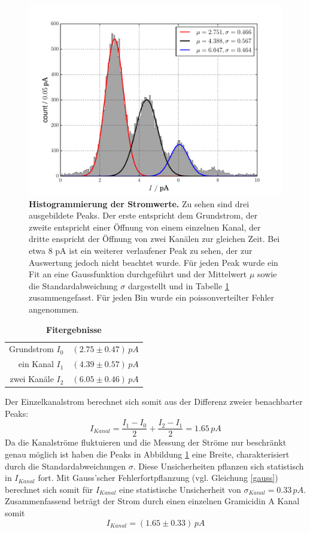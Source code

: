 \documentclass{include/thesisclass3}
\newcommand{\e}[1]{\,\si{#1}}
\begin{document}
\begin{figure}[H]
\centering
\includegraphics[scale=0.7]{images/single_hist.pdf}
\caption{\textbf{Histogrammierung der Stromwerte.} Zu sehen sind drei ausgebildete Peaks. Der erste entspricht dem Grundstrom, der zweite entspricht einer Öffnung von einem einzelnen Kanal, der dritte enspricht der Öffnung von zwei Kanälen zur gleichen Zeit. Bei etwa 8 pA ist ein weiterer verlaufener Peak zu sehen, der zur Auswertung jedoch nicht beachtet wurde. Für jeden Peak wurde ein Fit an eine Gaussfunktion durchgeführt und der Mittelwert $\mu$ sowie die Standardabweichung $\sigma$ dargestellt und in Tabelle \ref{singlefits} zusammengefasst. Für jeden Bin wurde ein poissonverteilter Fehler angenommen.}
\label{singlehist}
\end{figure}
\begin{table}[H]
\centering
\caption{\textbf{Fitergebnisse}}
\label{singlefits}
\begin{tabular}{rl}
\toprule
Grundstrom $I_0$ & $(2.75 \pm 0.47)\e{pA}$\\
ein Kanal $I_1$ & $(4.39 \pm 0.57)\e{pA}$\\
zwei Kanäle $I_2$ & $(6.05\pm 0.46)\e{pA}$\\
\bottomrule
\end{tabular}
\end{table}
Der Einzelkanalstrom berechnet sich somit aus der Differenz zweier benachbarter Peaks:
\[
I_{Kanal} = \frac{I_1-I_0}{2} + \frac{I_2-I_1}{2} = 1.65\e{pA}\]
Da die Kanalströme fluktuieren und die Messung der Ströme nur beschränkt genau möglich ist haben die Peaks in Abbildung \ref{singlehist} eine Breite, charakterisiert durch die Standardabweichungen $\sigma$. Diese Unsicherheiten pflanzen sich statistisch in $I_{Kanal}$ fort. Mit Gauss'scher Fehlerfortpflanzung (vgl. Gleichung \ref{gauss}) berechnet sich somit für $I_{Kanal}$ eine statistische Unsicherheit von $\sigma_{Kanal} = 0.33\e{pA}$. Zusammenfassend beträgt der Strom durch einen einzelnen Gramicidin A Kanal somit
\[ I_{Kanal} = (1.65 \pm 0.33)\e{pA}\]
\end{document}

